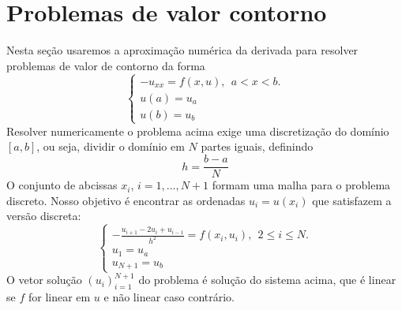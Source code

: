 \section{Problemas de valor contorno}

Nesta seção usaremos a aproximação numérica da derivada para resolver problemas de valor de contorno da forma
$$\left\{\begin{array}{l}-u_{xx}=f(x,u),~~ a<x<b.\\
u(a)=u_a\\
u(b)=u_b\end{array}
\right.
$$
Resolver numericamente o problema acima exige uma discretização do domínio $[a,b]$, ou seja, dividir o domínio em $N$ partes iguais, definindo
$$
h=\frac{b-a}{N}
$$
O conjunto de abcissas $x_i$, $i=1,...,N+1$ formam uma malha para o problema discreto. Nosso objetivo é encontrar as ordenadas $u_i=u(x_i)$ que satisfazem a versão discreta:
$$\left\{\begin{array}{l}-\frac{u_{i+1}-2u_i+u_{i-1}}{h^2}=f(x_i,u_i),~~ 2\leq i\leq N.\\
u_1=u_a\\
u_{N+1}=u_b\end{array}
\right.
$$
O vetor solução $(u_i)_{i=1}^{N+1}$ do problema é solução do sistema acima, que é linear se $f$ for linear em $u$ e não linear caso contrário.

